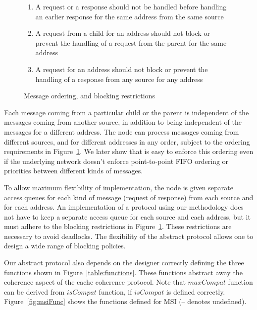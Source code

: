 
\begin{figure}
\begin{minipage}{\columnwidth}
\begin{enumerate}
\item A request or a response should not be handled before handling an earlier
response for the same address from the same source

\item A request from a child for an address should not block or prevent the
handling of a request from the parent for the same address

\item A request for an address should not block or prevent the handling of a
response from any source for any address
\end{enumerate}
\end{minipage}
\caption{Message ordering, and blocking restrictions}
\label{list:messageOrder}
\end{figure}


Each message coming from a particular child or the parent is independent of the
messages coming from another source, in addition to being independent of the
messages for a different address. The node can process messages coming from
different sources, and for different addresses in any order, subject to the
ordering requirements in Figure~\ref{list:messageOrder}. We later show that is
easy to enforce this ordering even if the underlying network doesn't enforce
point-to-point FIFO ordering or priorities between different kinds of messages.

To allow maximum flexibility of implementation, the node is given separate
access queues for each kind of message (request of response) from each source
and for each address. An implementation of a protocol using our methodology does
not have to keep a separate access queue for each source and each address, but
it must adhere to the blocking restrictions in Figure~\ref{list:messageOrder}.
These restrictions are necessary to avoid deadlocks. The flexibility of the
abstract protocol allows one to design a wide range of blocking policies.

Our abstract protocol also depends on the designer correctly defining the three
functions shown in Figure~\ref{table:functions}. These functions abstract away
the coherence aspect of the cache coherence protocol. Note that $maxCompat$
function can be derived from $isCompat$ function, if $isCompat$ is defined
correctly. Figure~\ref{fig:msiFunc} shows the functions defined for MSI (--
denotes undefined).

